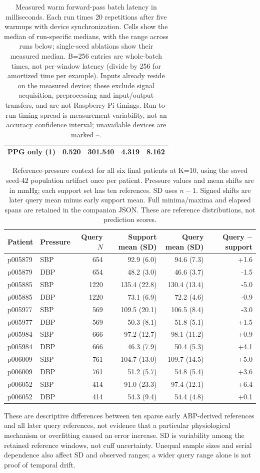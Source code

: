 \documentclass[11pt]{article}
\begin{document}
\begin{table}[!htbp]
\begin{tabular}{lrrrr}
PPG only (1) & 0.520 & 301.540 & 4.319 & 8.162\\
\bottomrule\end{tabular}
\caption{Measured warm forward-pass batch latency in milliseconds. Each run times 20 repetitions after five warmups with device synchronization. Cells show the median of run-specific medians, with the range across runs below; single-seed ablations show their measured median. B=256 entries are whole-batch times, not per-window latency (divide by 256 for amortized time per example). Inputs already reside on the measured device; these exclude signal acquisition, preprocessing and input/output transfers, and are not Raspberry Pi timings. Run-to-run timing spread is measurement variability, not an accuracy confidence interval; unavailable devices are marked --.}\end{table}
\begin{table}[!htbp]\centering\small
\begin{tabular}{llrrrr}\toprule
Patient & Pressure & Query $N$ & Support mean (SD) & Query mean (SD) & Query $-$ support\\\midrule
p005879 & SBP & 654 & 92.9 (6.0) & 94.6 (7.3) & +1.6\\
p005879 & DBP & 654 & 48.2 (3.0) & 46.6 (3.7) & -1.5\\
p005885 & SBP & 1220 & 135.4 (22.8) & 130.4 (13.4) & -5.0\\
p005885 & DBP & 1220 & 73.1 (6.9) & 72.2 (4.6) & -0.9\\
p005977 & SBP & 569 & 109.5 (20.1) & 106.5 (8.4) & -3.0\\
p005977 & DBP & 569 & 50.3 (8.1) & 51.8 (5.1) & +1.5\\
p005984 & SBP & 666 & 97.2 (12.7) & 98.1 (11.2) & +0.9\\
p005984 & DBP & 666 & 46.3 (7.9) & 50.4 (5.3) & +4.1\\
p006009 & SBP & 761 & 104.7 (13.0) & 109.7 (14.5) & +5.0\\
p006009 & DBP & 761 & 51.2 (5.7) & 54.8 (5.4) & +3.6\\
p006052 & SBP & 414 & 91.0 (23.3) & 97.4 (12.1) & +6.4\\
p006052 & DBP & 414 & 54.3 (9.4) & 54.4 (4.8) & +0.1\\
\bottomrule\end{tabular}
\caption{Reference-pressure context for all six final patients at K=10, using the saved seed-42 population artifact once per patient. Pressure values and mean shifts are in mmHg; each support set has ten references. SD uses $n-1$. Signed shifts are later query mean minus early support mean. Full minima/maxima and elapsed spans are retained in the companion JSON. These are reference distributions, not prediction scores.}\end{table}
These are descriptive differences between ten sparse early ABP-derived references and all later query references, not evidence that a particular physiological mechanism or overfitting caused an error increase. SD is variability among the retained reference windows, not cuff uncertainty. Unequal sample sizes and serial dependence also affect SD and observed ranges; a wider query range alone is not proof of temporal drift.\twocolumn
\end{document}
